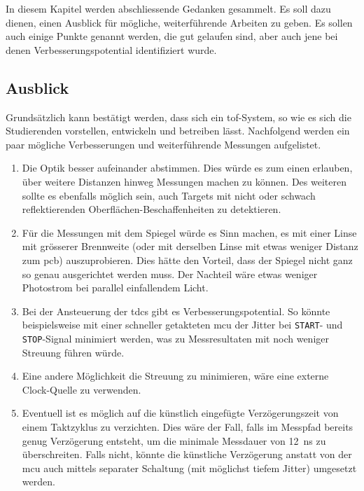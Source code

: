 In diesem Kapitel werden abschliessende Gedanken gesammelt. Es soll dazu dienen, einen Ausblick für mögliche,
weiterführende Arbeiten zu geben. Es sollen auch einige Punkte genannt werden, die gut gelaufen sind, aber auch jene bei
denen Verbesserungspotential identifiziert wurde.

\subsection{Ausblick}\label{sec:ausblick}

Grundsätzlich kann bestätigt werden, dass sich ein \acrshort{tof}-System, so wie es sich die Studierenden vorstellen,
entwickeln und betreiben lässt. Nachfolgend werden ein paar mögliche Verbesserungen und weiterführende Messungen
aufgelistet.

\begin{enumerate}
    \item Die Optik besser aufeinander abstimmen. Dies würde es zum einen erlauben, über weitere Distanzen hinweg
          Messungen machen zu können. Des weiteren sollte es ebenfalls möglich sein, auch Targets mit nicht oder schwach
          reflektierenden Oberflächen-Beschaffenheiten zu detektieren.
    \item Für die Messungen mit dem Spiegel würde es Sinn machen, es mit einer Linse mit grösserer Brennweite (oder mit
          derselben Linse mit etwas weniger Distanz zum \acrshort{pcb}) auszuprobieren. Dies hätte den Vorteil, dass der
          Spiegel nicht ganz so genau ausgerichtet werden muss. Der Nachteil wäre etwas weniger Photostrom bei parallel
          einfallendem Licht.
    \item Bei der Ansteuerung der \acrshort{tdc}s gibt es Verbesserungspotential. So könnte beispielsweise mit einer
          schneller getakteten \acrshort{mcu} der Jitter bei \lstinline|START|- und \lstinline|STOP|-Signal minimiert
          werden, was zu Messresultaten mit noch weniger Streuung führen würde.
    \item Eine andere Möglichkeit die Streuung zu minimieren, wäre eine externe Clock-Quelle zu verwenden.
    \item Eventuell ist es möglich auf die künstlich eingefügte Verzögerungszeit von einem Taktzyklus zu verzichten.
          Dies wäre der Fall, falls im Messpfad bereits genug Verzögerung entsteht, um die minimale Messdauer von 12~ns
          zu überschreiten. Falls nicht, könnte die künstliche Verzögerung anstatt von der \acrshort{mcu} auch mittels
          separater Schaltung (mit möglichst tiefem Jitter) umgesetzt werden.

\end{enumerate}
